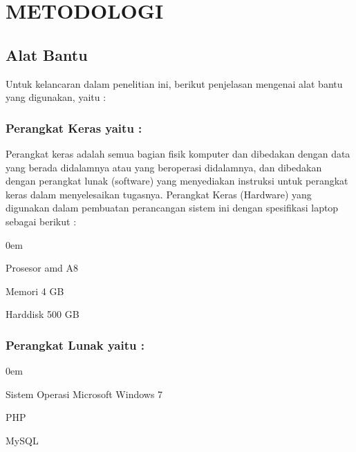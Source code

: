 \documentclass{jtetiproposalskripsi}
\begin{document}
\chapter{METODOLOGI}

\section{Alat Bantu}
Untuk kelancaran dalam penelitian ini, berikut penjelasan mengenai alat bantu yang digunakan, yaitu :

\vspace{-0.5cm}

\subsection{Perangkat Keras yaitu :}
Perangkat keras adalah semua bagian fisik komputer dan dibedakan dengan data yang berada didalamnya atau yang beroperasi didalamnya, dan dibedakan dengan perangkat lunak (software) yang menyediakan instruksi untuk perangkat keras dalam menyelesaikan tugasnya.
Perangkat Keras (Hardware) yang digunakan dalam pembuatan perancangan sistem ini dengan spesifikasi laptop sebagai berikut :

\begin{enumerate}[a.]
\begin{singlespace}
\itemsep0em
\item Prosesor amd A8
\item Memori 4 GB
\item Harddisk 500 GB
\end{singlespace}
\end{enumerate}

\subsection{Perangkat Lunak yaitu :}
\begin{enumerate}[a.]
\begin{singlespace}
\itemsep0em
\item Sistem Operasi Microsoft Windows 7 
\item PHP
\item MySQL
\end{singlespace}
\end{enumerate}

\newpage
\end{document}
